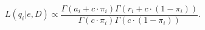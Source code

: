 \documentclass[9pt]{article}
\begin{document}
\begin{equation}
L(q_{i}| e, D) \propto \frac{\Gamma(a_i + c\cdot \pi_{i}) \Gamma(r_i + c\cdot (1-\pi_{i}))}{\Gamma(c\cdot \pi_{i})\Gamma(c\cdot (1-\pi_{i}))}. \label{eqn:llk}
\end{equation}











\end{document}
